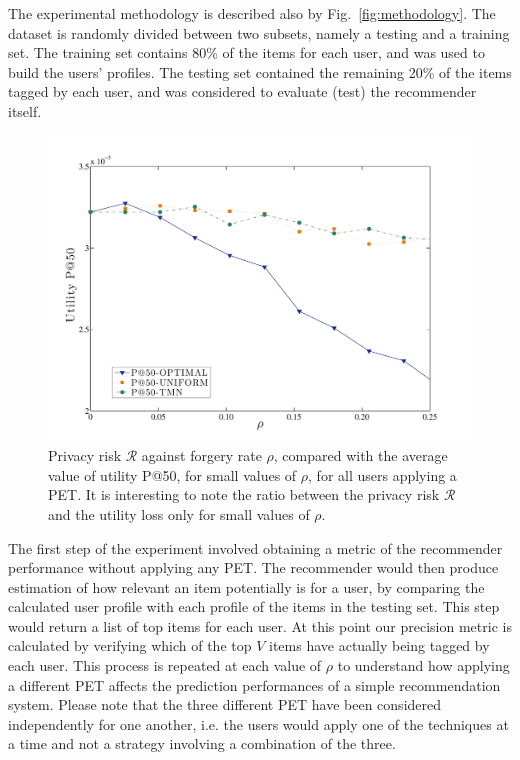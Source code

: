 The experimental methodology is described also by Fig.~\ref{fig:methodology}. The dataset is randomly divided between two subsets, namely a testing and a training set. The training set contains 80\% of the items for each user, and was used to build the users' profiles. The testing set contained the remaining 20\% of the items tagged by each user, and was considered to evaluate (test) the recommender itself.

\begin{figure}[htb]  
\includegraphics[width=\textwidth]{figures/Fig6b.pdf}
\caption[Privacy Risk against forgery rate compared to the average utility value P@50]{Privacy risk $\mathcal{R}$ against forgery rate $\rho$, compared with the average value of utility P@50, for small values of $\rho$, for all users applying a PET. It is interesting to note the ratio between the privacy risk $\mathcal{R}$ and the utility loss only for small values of $\rho$.
\label{fig:Utility-Risk-Rho-Small}}
\end{figure}

The first step of the experiment involved obtaining a metric of the recommender performance without applying any PET. The recommender would then produce estimation of how relevant an item potentially is for a user, by comparing the calculated user profile with each profile of the items in the testing set. This step would return a list of top items for each user. At this point our precision metric is calculated by verifying which of the top $V$ items have actually being tagged by each user. This process is repeated at each value of $\rho$ to understand how applying a different PET affects the prediction performances of a simple recommendation system. Please note that the three different PET have been considered independently for one another, i.e. the users would apply one of the techniques at a time and not a strategy involving a combination of the three.

